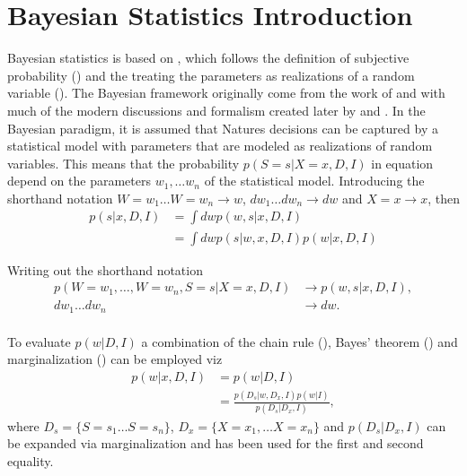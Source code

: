 \chapter{Bayesian Statistics Introduction}
Bayesian statistics is based on , which follows the definition of subjective probability () and the treating the parameters as realizations of a random variable (). The Bayesian framework originally come from the work of \citet{Bayes:63} and \citet{laplace_thorie_1812} with much of the modern discussions and formalism created later by \citet{Finetti1937LaP,Jeffreys1940} and \citet{Savage1954}.\newline
In the Bayesian paradigm, it is assumed that Natures decisions can be captured by a statistical model with parameters that are modeled as realizations of random variables. This means that the probability $p(S=s|X=x,D,I)$ in equation  depend on the parameters $w_1,\dots w_n$ of the statistical model. Introducing the shorthand notation $W=w_1\dots W=w_n \rightarrow w$, $dw_1\dots dw_n \rightarrow dw$ and $X=x \rightarrow x$, then
\begin{equation}
	\begin{split}
		p(s|x,D,I) &= \int dw p(w,s|x,D,I)\\
		& = \int dw p(s|w,x,D,I)p(w|x,D,I)
	\end{split}
	\label{eq:hest1}
\end{equation}
\begin{example}
	Writing out the shorthand notation
	\begin{equation}
		\begin{split}
			p(W=w_1,\dots,W= w_n,S = s|X = x,D,I)&\rightarrow p(w,s|x,D,I),\\
			dw_1\dots dw_n &\rightarrow dw.\\
		\end{split}
	\end{equation}
\end{example}

To evaluate $p(w|D,I)$ a combination of the chain rule (), Bayes' theorem () and marginalization () can be employed viz
\begin{equation}
	\begin{split}
		p(w|x,D,I) &= p(w|D,I)\\
		&= \frac{p(D_s|w,D_x,I)p(w|I)}{p(D_s|D_x,I)},
	\end{split}
	\label{eq:pa2}
\end{equation}
where $D_s= \{S=s_1\dots S=s_n\}$, $D_x = \{X=x_1,\dots X=x_n\}$ and $p(D_s|D_x,I)$ can be expanded via marginalization and  has been used for the first and second equality.

